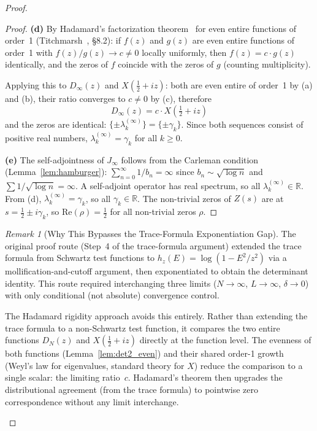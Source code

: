 \documentclass{pre-aomart}
\def\zeta{Z}%
\def\xi{X}%
\theoremstyle{plain}
\theoremstyle{definition}
\theoremstyle{remark}
\newtheorem{remark}[theorem]{Remark}
\begin{document}
\begin{proof}
\begin{proof}
\textbf{(d)} By Hadamard's factorization theorem~\cite{Hadamard1893} for even entire functions
of order~1 (Titchmarsh~\cite{Titchmarsh1986}, \S8.2): if $f(z)$ and $g(z)$
are even entire functions of order~1 with $f(z)/g(z) \to c \neq 0$ locally
uniformly, then $f(z) = c \cdot g(z)$ identically, and the zeros of $f$
coincide with the zeros of $g$ (counting multiplicity).

Applying this to $D_\infty(z)$ and $\xi(\tfrac12+iz)$: both are even entire
of order~1 by (a) and (b), their ratio converges to $c \neq 0$ by (c),
therefore
\[
D_\infty(z) = c \cdot \xi\left(\tfrac12+iz\right)
\]
and the zeros are identical: $\{\pm\lambda_k^{(\infty)}\} = \{\pm\gamma_k\}$.
Since both sequences consist of positive real numbers,
$\lambda_k^{(\infty)} = \gamma_k$ for all $k \ge 0$.

\textbf{(e)} The self-adjointness of $J_\infty$ follows from the Carleman
condition (Lemma~\ref{lem:hamburger}): $\sum_{n=0}^\infty 1/b_n = \infty$
since $b_n \sim \sqrt{\log n}$ and $\sum 1/\sqrt{\log n} = \infty$.  A
self-adjoint operator has real spectrum, so all $\lambda_k^{(\infty)} \in
\mathbb{R}$.  From (d), $\lambda_k^{(\infty)} = \gamma_k$, so all
$\gamma_k \in \mathbb{R}$.  The non-trivial zeros of $\zeta(s)$ are at
$s = \tfrac12 \pm i\gamma_k$, so $\mathrm{Re}(\rho) = \tfrac12$ for all
non-trivial zeros $\rho$.
\end{proof}

\begin{remark}[Why This Bypasses the Trace-Formula Exponentiation Gap]\label{rem:bypass}
The original proof route (Step~4 of the trace-formula argument) extended the
trace formula from Schwartz test functions to $h_z(E) = \log(1 - E^2/z^2)$
via a mollification-and-cutoff argument, then exponentiated to obtain the
determinant identity.  This route required interchanging three limits
($N \to \infty$, $L \to \infty$, $\delta \to 0$) with only conditional
(not absolute) convergence control.

The Hadamard rigidity approach avoids this entirely.  Rather than extending
the trace formula to a non-Schwartz test function, it compares the two
entire functions $D_N(z)$ and $\xi(\tfrac12+iz)$ directly at the function
level.  The evenness of both functions (Lemma~\ref{lem:det2_even}) and
their shared order-1 growth (Weyl's law for eigenvalues, standard theory
for $\xi$) reduce the comparison to a single scalar: the limiting ratio~$c$.
Hadamard's theorem then upgrades the distributional agreement (from the
trace formula) to pointwise zero correspondence without any limit
interchange.


\end{remark}
\end{proof}
\end{document}

